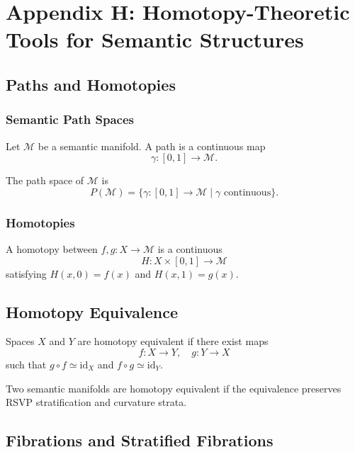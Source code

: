 \chapter*{Appendix H: Homotopy-Theoretic Tools for Semantic Structures}

\section{Paths and Homotopies}

\subsection{Semantic Path Spaces}

Let $\mathcal{M}$ be a semantic manifold.  
A path is a continuous map
\[
\gamma : [0,1] \to \mathcal{M}.
\]

\begin{definition}
The path space of $\mathcal{M}$ is
\[
P(\mathcal{M}) = \{ \gamma:[0,1]\to\mathcal{M} \mid \gamma \text{ continuous} \}.
\]
\end{definition}

\subsection{Homotopies}

A homotopy between $f,g : X\to\mathcal{M}$ is a continuous
\[
H: X\times[0,1]\to\mathcal{M}
\]
satisfying $H(x,0)=f(x)$ and $H(x,1)=g(x)$.

\section{Homotopy Equivalence}

\begin{definition}
Spaces $X$ and $Y$ are homotopy equivalent if there exist maps
\[
f:X\to Y, \quad g:Y\to X
\]
such that $g\circ f\simeq \mathrm{id}_X$ and $f\circ g\simeq \mathrm{id}_Y$.
\end{definition}

\begin{definition}
Two semantic manifolds are homotopy equivalent if the equivalence preserves RSVP stratification and curvature strata.
\end{definition}

\section{Fibrations and Stratified Fibrations}

